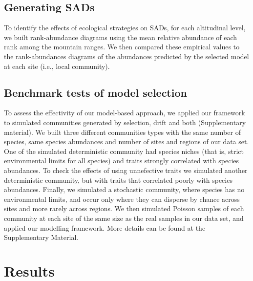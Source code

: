 \documentclass[12pt]{article}
\begin{document}
\subsection*{Generating SADs}

To identify the effects of ecological strategies on SADs, for each
altitudinal level, we built rank-abundance diagrams using the mean
relative abundance of each rank among the mountain ranges. We then
compared these empirical values to the rank-abundances diagrams of the
abundances predicted by the selected model at each site (i.e., local
community).

\subsection*{Benchmark tests of model selection}

To assess the effectivity of our model-based approach, we applied our framework to simulated communities generated by selection, drift and both (Supplementary material).
We built three different communities types with the same number of species, same species abundances and number of sites and regions of our data set. One of the simulated deterministic community had species niches (that is, strict environmental limits for all species) and traits strongly correlated with species abundances. To check the effects of using unnefective traits we simulated another deterministic community, but with traits that correlated poorly with species abundances. Finally, we simulated a stochastic community, where species has no environmental limits, and occur only
where they can %
disperse by chance across sites and more rarely across regions.
We then simulated Poisson samples of each community at each site of the same size as the real samples in our data set, and applied our
modelling %
framework. More details can be found at the Supplementary Material.


\section*{Results}

\end{document}
